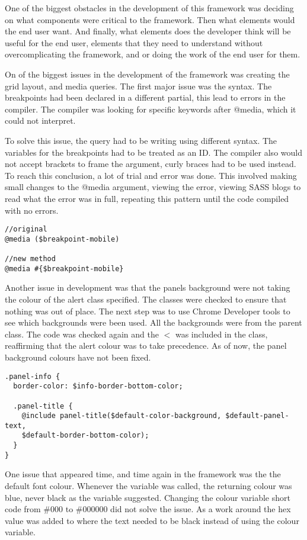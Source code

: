 One of the biggest obstacles in the development of this framework was deciding on what components were critical to the framework. Then what elements would the end user want. And finally, what elements does the developer think will be useful for the end user, elements that they need to understand without overcomplicating the framework, and or doing the work of the end user for them.

On of the biggest issues in the development of the framework was creating the grid layout, and media queries. The first major issue was the syntax. The breakpoints had been declared in a different partial, this lead to errors in the compiler. The compiler was looking for specific keywords after @media, which it could not interpret.

To solve this issue, the query had to be writing using different syntax. The variables for the breakpoints had to be treated as an ID. The compiler also would not accept brackets to frame the argument, curly braces had to be used instead. To reach this conclusion, a lot of trial and error was done. This involved making small changes to the @media argument, viewing  the error, viewing \gls{SASS} blogs to read what the error was in full, repeating this pattern until the code compiled with no errors. 
\begin{lstlisting}[language=CSS3]
//original 
@media ($breakpoint-mobile)

//new method
@media #{$breakpoint-mobile} 
\end{lstlisting}

Another issue in development was that the panels background were not taking the colour of the alert class specified. The classes were checked to ensure that nothing was out of place. The next step was to use Chrome Developer tools to see which backgrounds were been used. All the backgrounds were from the parent class. The code was checked again and the $<$ was included in the class, reaffirming that the alert colour was to take precedence. As of now, the panel background colours have not been fixed.

\begin{lstlisting}[language=CSS3]
.panel-info {
  border-color: $info-border-bottom-color;

  .panel-title {
    @include panel-title($default-color-background, $default-panel-text, 
    $default-border-bottom-color);
  }
}
\end{lstlisting}

One issue that appeared time, and time again in the framework was the the default font colour. Whenever the variable was called, the returning colour was blue, never black as the variable suggested. Changing the colour variable short code from \#000 to \#000000 did not solve the issue. As a work around the hex value was added to where the text needed to be black instead of using the colour variable. 

